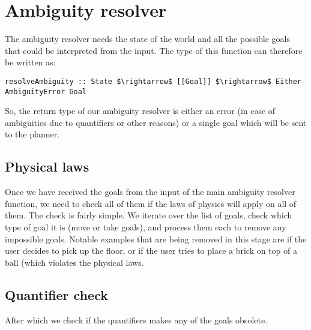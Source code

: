 
\section*{Ambiguity resolver}
The ambiguity resolver needs the state of the world and all the possible goals that could be interpreted from the input.
The type of this function can therefore be written as:
\begin{lstlisting}
resolveAmbiguity :: State $\rightarrow$ [[Goal]] $\rightarrow$ Either AmbiguityError Goal
\end{lstlisting}

So, the return type of our ambiguity resolver is either an error (in case of ambiguities due to quantifiers or other reasons) or a single goal which will be sent to the planner.

\subsection*{Physical laws}
Once we have received the goals from the input of the main ambiguity resolver function, we need to check all of them if the laws of physics will apply on all of them.
The check is fairly simple.
We iterate over the list of goals, check which type of goal it is (move or take goals), and process them each to remove any impossible goals.
Notable examples that are being removed in this stage are if the user decides to pick up the floor, or if the user tries to place a brick on top of a ball (which violates the physical laws.

\subsection*{Quantifier check}
After which we check if the quantifiers makes any of the goals obsolete. %


